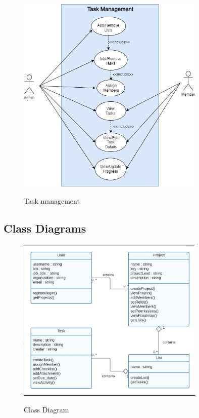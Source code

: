 \begin{figure}[!htbp]
    \centering
    \includegraphics[width = 0.8\textwidth]{Tasksmngmnt.png}\\[0.1in]
    \caption{Task management}
    \label{fig:my_label}
\end{figure}

\FloatBarrier

\subsection{Class Diagrams}
\begin{figure}[!htbp]
    \centering
    \includegraphics[width = 0.8\textwidth]{classdiagram.png}\\[0.1in]
    \caption{Class Diagram}
    \label{fig:my_label}
\end{figure}

